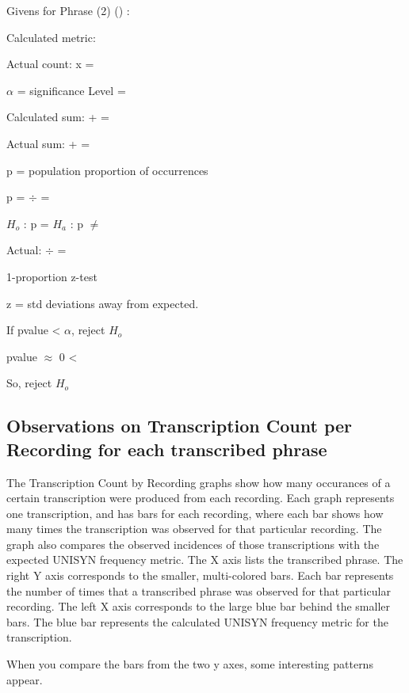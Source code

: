 Givens for Phrase (2) (\phraseTwo) :

Calculated metric: \unisynFreqForPhraseTwo

Actual count: x = \USATranscriptionsOfPhraseTwo

$\alpha$ = significance Level = \alphaSigFigs

Calculated sum: \unisynFreqForPhraseOne + \unisynFreqForPhraseTwo =  \unisynCombinedFreq

Actual sum: \USATranscriptionsOfPhraseOne + \USATranscriptionsOfPhraseTwo = \USACombinedTranscriptions

p = population proportion of \phraseOne occurrences

p = \unisynFreqForPhraseOne   $\div$  \unisynCombinedFreq  = \pvalue 

$H_{o}$ :  p = \pvalue 
$H_{a}$ :  p $\neq$ \pvalue 

Actual: 
\USATranscriptionsOfPhraseOne  $\div$ \USACombinedTranscriptions  = 

1-proportion z-test

z = \UNISYNzVal std deviations away from expected.

If pvalue < $\alpha$, reject $H_{o}$

pvalue $\approx$ 0 < \alphaSigFigs

So, reject $H_{o}$


\subsection{Observations on Transcription Count per Recording for each transcribed phrase}
\label{results:transcriptionCountPerRecording}

The Transcription Count by Recording graphs show how many occurances of a certain transcription were produced from each recording. Each graph represents one transcription, and has bars for each recording, where each bar shows how many times the transcription was observed for that particular recording. The graph also compares the observed incidences of those transcriptions with the expected UNISYN frequency metric. The X axis lists the transcribed phrase.  The right Y axis corresponds to the smaller, multi-colored bars. Each bar represents the number of times that a transcribed phrase was observed for that particular recording. 
The left X axis corresponds to the large blue bar behind the smaller bars. The blue bar represents the calculated UNISYN frequency metric for the transcription.


When you compare the bars from the two y axes, some interesting patterns appear. 

